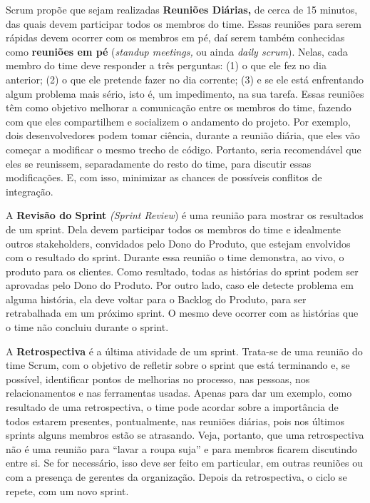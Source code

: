 \documentclass[
  11pt,
  twoside]{book}
\begin{document}
  

Scrum propõe que sejam realizadas \textbf{Reuniões Diárias,} de cerca de
15 minutos, das quais devem participar todos os membros do time. Essas
reuniões para serem rápidas devem ocorrer com os membros em pé, daí
serem também conhecidas como \textbf{reuniões em pé} (\emph{standup
meetings,} ou ainda \emph{daily scrum}). Nelas, cada membro do time deve
responder a três perguntas: (1) o que ele fez no dia anterior; (2) o que
ele pretende fazer no dia corrente; (3) e se ele está enfrentando algum
problema mais sério, isto é, um impedimento, na sua tarefa. Essas
reuniões têm como objetivo melhorar a comunicação entre os membros do
time, fazendo com que eles compartilhem e socializem o andamento do
projeto. Por exemplo, dois desenvolvedores podem tomar ciência, durante
a reunião diária, que eles vão começar a modificar o mesmo trecho de
código. Portanto, seria recomendável que eles se reunissem,
separadamente do resto do time, para discutir essas modificações. E, com
isso, minimizar as chances de possíveis conflitos de integração.

 

A \textbf{Revisão do Sprint} \emph{(Sprint Review}) é uma reunião para
mostrar os resultados de um sprint. Dela devem participar todos os
membros do time e idealmente outros stakeholders, convidados pelo Dono
do Produto, que estejam envolvidos com o resultado do sprint. Durante
essa reunião o time demonstra, ao vivo, o produto para os clientes. Como
resultado, todas as histórias do sprint podem ser aprovadas pelo Dono do
Produto. Por outro lado, caso ele detecte problema em alguma história,
ela deve voltar para o Backlog do Produto, para ser retrabalhada em um
próximo sprint. O mesmo deve ocorrer com as histórias que o time não
concluiu durante o sprint.

 

A \textbf{Retrospectiva} é a última atividade de um sprint. Trata-se de
uma reunião do time Scrum, com o objetivo de refletir sobre o sprint que
está terminando e, se possível, identificar pontos de melhorias no
processo, nas pessoas, nos relacionamentos e nas ferramentas usadas.
Apenas para dar um exemplo, como resultado de uma retrospectiva, o time
pode acordar sobre a importância de todos estarem presentes,
pontualmente, nas reuniões diárias, pois nos últimos sprints alguns
membros estão se atrasando. Veja, portanto, que uma retrospectiva não é
uma reunião para ``lavar a roupa suja'' e para membros ficarem
discutindo entre si. Se for necessário, isso deve ser feito em
particular, em outras reuniões ou com a presença de gerentes da
organização. Depois da retrospectiva, o ciclo se repete, com um novo
sprint.
\end{document}
